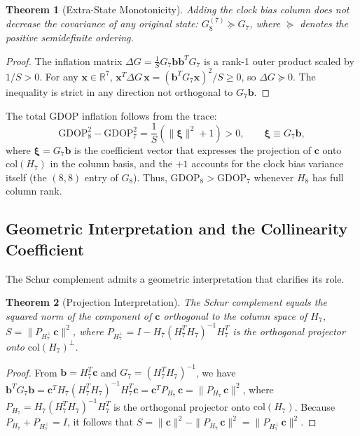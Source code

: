 \documentclass[letterpaper,times]{IONconf-v2}
\theoremstyle{plain}
\newtheorem{theorem}{Theorem}
\theoremstyle{remark}
\begin{document}
\begin{theorem}[Extra-State Monotonicity]\label{thm:covariance_inflation}
Adding the clock bias column does not decrease the covariance of any original state: $G_8^{(7)} \succeq G_7$, where $\succeq$ denotes the positive semidefinite ordering.
\end{theorem}

\begin{proof}
The inflation matrix $\Delta G = \frac{1}{S} G_7 \mathbf{b}\mathbf{b}^T G_7$ is a rank-1 outer product scaled by $1/S > 0$. For any $\mathbf{x} \in \mathbb{R}^7$, $\mathbf{x}^T \Delta G\,\mathbf{x} = (\mathbf{b}^T G_7 \mathbf{x})^2/S \geq 0$, so $\Delta G \succeq 0$. The inequality is strict in any direction not orthogonal to $G_7\mathbf{b}$.
\end{proof}

The total GDOP inflation follows from the trace:
\begin{equation}\label{eq:gdop_increase}
\mathrm{GDOP}_8^2 - \mathrm{GDOP}_7^2 = \frac{1}{S}\left(\|\boldsymbol{\xi}\|^2 + 1\right) > 0,
\qquad \boldsymbol{\xi} \equiv G_7\mathbf{b},
\end{equation}
where $\boldsymbol{\xi} = G_7\mathbf{b}$ is the coefficient vector that expresses the projection of $\mathbf{c}$ onto $\mathrm{col}(H_7)$ in the column basis, and the $+1$ accounts for the clock bias variance itself (the $(8,8)$ entry of $G_8$). Thus, $\mathrm{GDOP}_8 > \mathrm{GDOP}_7$ whenever $H_8$ has full column rank.

\vspace{-10pt}

\subsection{Geometric Interpretation and the Collinearity Coefficient}\label{subsec:collinearity}

The Schur complement admits a geometric interpretation that clarifies its role.

\begin{theorem}[Projection Interpretation]\label{thm:S_projection}
The Schur complement equals the squared norm of the component of $\mathbf{c}$ orthogonal to the column space of $H_7$, $S = \|P_{H_7^\perp}\,\mathbf{c}\|^2$, where $P_{H_7^\perp} = I - H_7(H_7^TH_7)^{-1}H_7^T$ is the orthogonal projector onto $\mathrm{col}(H_7)^\perp$.
\end{theorem}

\begin{proof}
From $\mathbf{b} = H_7^T\mathbf{c}$ and $G_7 = (H_7^TH_7)^{-1}$, we have $\mathbf{b}^TG_7\mathbf{b} = \mathbf{c}^T H_7(H_7^TH_7)^{-1}H_7^T\mathbf{c} = \mathbf{c}^TP_{H_7}\,\mathbf{c} = \|P_{H_7}\,\mathbf{c}\|^2$, where $P_{H_7} = H_7(H_7^TH_7)^{-1}H_7^T$ is the orthogonal projector onto $\mathrm{col}(H_7)$. Because $P_{H_7} + P_{H_7^\perp} = I$, it follows that $S = \|\mathbf{c}\|^2 - \|P_{H_7}\,\mathbf{c}\|^2 = \|P_{H_7^\perp}\,\mathbf{c}\|^2$.
\end{proof}
\end{document}
